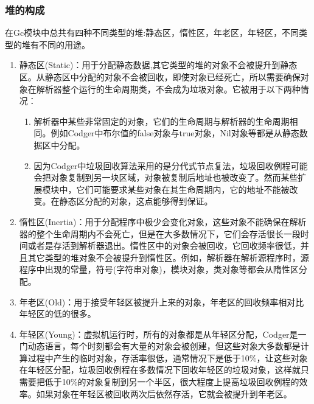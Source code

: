 \subsubsection{堆的构成}
在Gc模块中总共有四种不同类型的堆:静态区，惰性区，年老区，年轻区，不同类型的堆有不同的用途。
\begin{enumerate}
\item 静态区(Static)：用于分配静态数据,其它类型的堆的对象不会被提升到静态区。从静态区中分配的对象不会被回收，即使对象已经死亡，所以需要确保对象在解析器整个运行的生命周期类，不会成为垃圾对象。它被用于以下两种情况：
\begin{enumerate}
\item 解析器中某些非常固定的对象，它们的生命周期与解析器的生命周期相同。例如Codger中布尔值的false对象与true对象，Nil对象等都是从静态数据区中分配。
\item 因为Codger中垃圾回收算法采用的是分代式节点复法，垃圾回收例程可能会把对象复制到另一块区域，对象被复制后地址也被改变了。然而某些扩展模块中，它们可能要求某些对象在其生命周期内，它的地址不能被改变。在静态区分配的对象，这点能够得到保证。
\end{enumerate}
\item 惰性区(Inertia)：用于分配程序中极少会变化对象，这些对象不能确保在解析器的整个生命周期内不会死亡，但是在大多数情况下，它们会存活很长一段时间或者是存活到解析器退出。惰性区中的对象会被回收，它回收频率很低，并且其它类型的堆对象不会被提升到惰性区。例如，解析器在解析源程序时，源程序中出现的常量，符号(字符串对象)，模块对象，类对象等都会从隋性区分配。
\item 年老区(Old)：用于接受年轻区被提升上来的对象，年老区的回收频率相对比年轻区的低的很多。
\item 年轻区(Young)：虚拟机运行时，所有的对象都是从年轻区分配，Codger是一门动态语言，每个时刻都会有大量的对象会被创建，但这些对象大多数都是计算过程中产生的临时对象，存活率很低，通常情况下是低于10\%，让这些对象在年轻区分配，垃圾回收例程在多数情况下回收年轻区的垃圾对象，这样就只需要把低于10\%的对象复制到另一个半区，很大程度上提高垃圾回收例程的效率。如果对象在年轻区被回收两次后依然存活，它就会被提升到年老区。
\end{enumerate}

